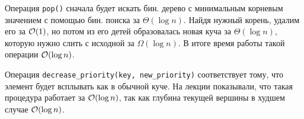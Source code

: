 \begin{enumerate}
\begin{solution}
      Операция \texttt{pop()} сначала будет искать бин. дерево с минимальным корневым значением с помощью бин. поиска за $\Theta(\log{n})$. Найдя нужный корень, удалим его за $\mathcal{O}(1)$, но потом из его детей образовалась новая куча за $\Theta(\log{n})$, которую нужно слить с исходной за $\Omega(\log{n})$. В итоге время работы такой операции $\mathcal{O}(\log{n})$.

      Операция \texttt{decrease\_priority(key, new\_priority)} соответствует тому, что элемент будет всплывать как в обычной куче. На лекции показывали, что такая процедура работает за $\mathcal{O}(\log{n})$, так как глубина текущей вершины в худшем случае $\mathcal{O}(\log{n})$.
      
    \end{solution}


	
	

\end{enumerate}